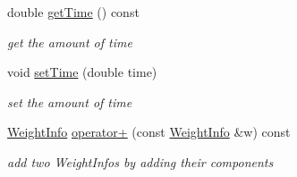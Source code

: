 \begin{DoxyCompactItemize}
double \hyperlink{class_weight_info_a97e79f7bf650ad7756d4e3257baa11da}{get\+Time} () const 
\begin{DoxyCompactList}\small\item\em get the amount of time \end{DoxyCompactList}\item 
void \hyperlink{class_weight_info_ac38800f9060360b80ee0d7547b228b60}{set\+Time} (double time)
\begin{DoxyCompactList}\small\item\em set the amount of time \end{DoxyCompactList}\item 
\hyperlink{class_weight_info}{Weight\+Info} \hyperlink{class_weight_info_a70f3f16d32900beda84d378e911de764}{operator+} (const \hyperlink{class_weight_info}{Weight\+Info} \&w) const 
\begin{DoxyCompactList}\small\item\em add two Weight\+Infos by adding their components \end{DoxyCompactList}\end{DoxyCompactItemize}
